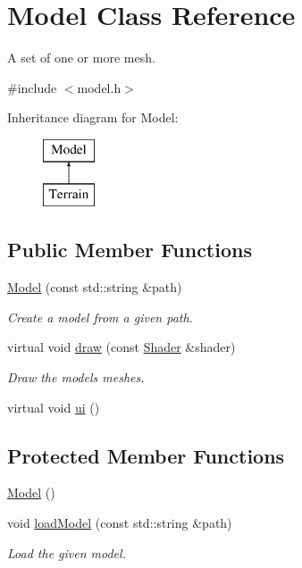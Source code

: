 \hypertarget{classModel}{}\section{Model Class Reference}
\label{classModel}


A set of one or more mesh.  




{\ttfamily \#include $<$model.\+h$>$}

Inheritance diagram for Model\+:\begin{figure}[H]
\begin{center}
\leavevmode
\includegraphics[height=2.000000cm]{classModel}
\end{center}
\end{figure}
\subsection*{Public Member Functions}
\begin{DoxyCompactItemize}
\item 
\hyperlink{classModel_ac455fa8d2babc9ea4d344d585a505ed5}{Model} (const std\+::string \&path)
\begin{DoxyCompactList}\small\item\em Create a model from a given path. \end{DoxyCompactList}\item 
virtual void \hyperlink{classModel_a125ff27c588f7f9acfc59c20dcc313b2}{draw} (const \hyperlink{classShader}{Shader} \&shader)
\begin{DoxyCompactList}\small\item\em Draw the model\textquotesingle{}s meshes. \end{DoxyCompactList}\item 
virtual void \hyperlink{classModel_a6c1d9003a9cb7699ba70b250c69d8ba4}{ui} ()
\end{DoxyCompactItemize}
\subsection*{Protected Member Functions}
\begin{DoxyCompactItemize}
\item 
\hyperlink{classModel_ae3b375de5f6df4faf74a95d64748e048}{Model} ()
\item 
void \hyperlink{classModel_a3d0a1ca0dc53b54cf5f6d956b156b7ec}{load\+Model} (const std\+::string \&path)
\begin{DoxyCompactList}\small\item\em Load the given model. \end{DoxyCompactList}\end{DoxyCompactItemize}
